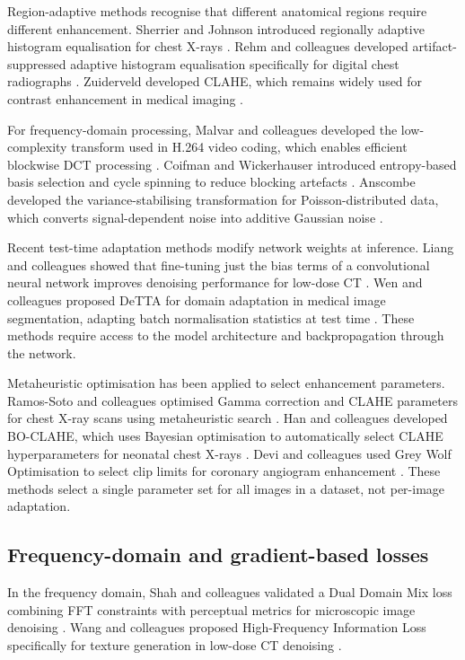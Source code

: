 Region-adaptive methods recognise that different anatomical regions require different enhancement. Sherrier and Johnson introduced regionally adaptive histogram equalisation for chest X-rays \citep{sherrier1987regionally}. Rehm and colleagues developed artifact-suppressed adaptive histogram equalisation specifically for digital chest radiographs \citep{rehm1990design}. Zuiderveld developed CLAHE, which remains widely used for contrast enhancement in medical imaging \citep{zuiderveld1994contrast}.

For frequency-domain processing, Malvar and colleagues developed the low-complexity transform used in H.264 video coding, which enables efficient blockwise DCT processing \citep{malvar2003low}. Coifman and Wickerhauser introduced entropy-based basis selection and cycle spinning to reduce blocking artefacts \citep{coifman1992entropy}. Anscombe developed the variance-stabilising transformation for Poisson-distributed data, which converts signal-dependent noise into additive Gaussian noise \citep{anscombe1948transformation}.

Recent test-time adaptation methods modify network weights at inference. Liang and colleagues showed that fine-tuning just the bias terms of a convolutional neural network improves denoising performance for low-dose CT \citep{liang2023segmentation}. Wen and colleagues proposed DeTTA for domain adaptation in medical image segmentation, adapting batch normalisation statistics at test time \citep{wen2024denoising}. These methods require access to the model architecture and backpropagation through the network.

Metaheuristic optimisation has been applied to select enhancement parameters. Ramos-Soto and colleagues optimised Gamma correction and CLAHE parameters for chest X-ray scans using metaheuristic search \citep{ramos2025visual}. Han and colleagues developed BO-CLAHE, which uses Bayesian optimisation to automatically select CLAHE hyperparameters for neonatal chest X-rays \citep{han2025bo}. Devi and colleagues used Grey Wolf Optimisation to select clip limits for coronary angiogram enhancement \citep{devi2026metaheuristics}. These methods select a single parameter set for all images in a dataset, not per-image adaptation.

\subsection{Frequency-domain and gradient-based losses}

In the frequency domain, Shah and colleagues validated a Dual Domain Mix loss combining FFT constraints with perceptual metrics for microscopic image denoising \citep{shah2022impact}. Wang and colleagues proposed High-Frequency Information Loss specifically for texture generation in low-dose CT denoising \citep{wang2023self}.


